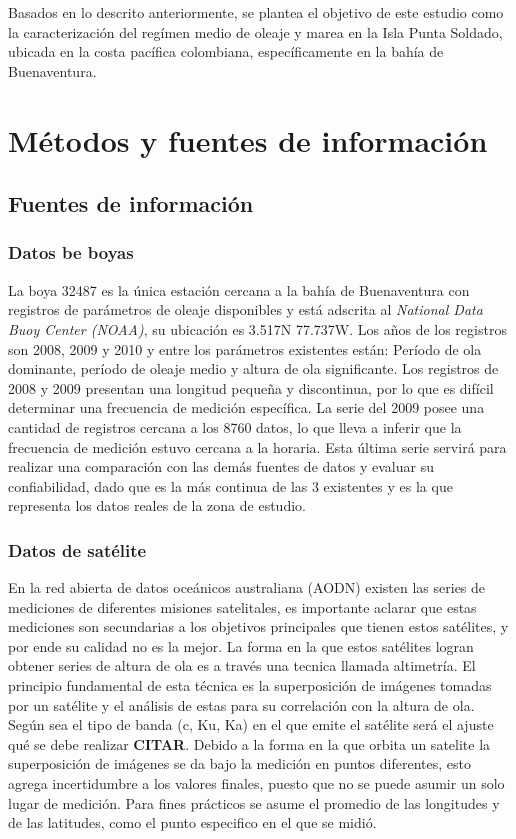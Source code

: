 \documentclass[5p,times,authoryear]{elsarticle}
\begin{document}
Basados en lo descrito anteriormente, se plantea el objetivo de este estudio como la caracterización del regímen medio de oleaje y marea en la Isla Punta Soldado, ubicada en la costa pacífica colombiana, específicamente en la bahía de Buenaventura.

\section{Métodos y fuentes de información}

\subsection{Fuentes de información}

\subsubsection{Datos be boyas}

La boya 32487 es la única estación cercana a la bahía de Buenaventura con registros de parámetros de oleaje disponibles y está adscrita al \textit{National Data Buoy Center (NOAA)}, su ubicación es 3.517N 77.737W. Los años de los registros son 2008, 2009 y 2010 y entre los parámetros existentes están: Período de ola dominante, período de oleaje medio y altura de ola significante. Los registros de 2008 y 2009 presentan una longitud pequeña y discontinua, por lo que es difícil determinar una frecuencia de medición específica. La serie del 2009 posee una cantidad de registros cercana a los 8760 datos, lo que lleva a inferir que la frecuencia de medición estuvo cercana a la horaria. Esta última serie servirá para realizar una comparación con las demás fuentes de datos y evaluar su confiabilidad, dado que es la más continua de las 3 existentes y es la que representa los datos reales de la zona de estudio.


\subsubsection{Datos de satélite}

En la red abierta de datos oceánicos australiana (AODN) existen las series de mediciones de diferentes misiones satelitales, es importante aclarar que estas mediciones son secundarias a los objetivos principales que tienen estos satélites, y por ende su calidad no es la mejor. La forma en la que estos satélites logran obtener series de altura de ola es a través una tecnica llamada altimetría. El principio fundamental de esta técnica es la superposición de imágenes tomadas por un satélite y el análisis de estas para su correlación con la altura de ola. Según sea el tipo de banda (c, Ku, Ka) en el que emite el satélite será el ajuste qué se debe realizar \textbf{CITAR}. Debido a la forma en la que orbita un satelite la superposición de imágenes se da bajo la medición en puntos diferentes, esto agrega incertidumbre a los valores finales, puesto que no se puede asumir un solo lugar de medición. Para fines prácticos se asume el promedio de las longitudes y de las latitudes, como el punto especifico en el que se midió.
\end{document}
